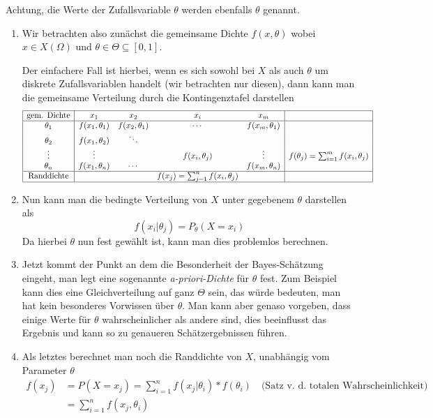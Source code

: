 Achtung, die Werte der Zufallsvariable $\theta$ werden ebenfalls $\theta$ genannt.
\begin{enumerate}
	\item 
	Wir betrachten also zunächst die gemeinsame Dichte $f(x,\theta)$ wobei $x\in X(\Omega)$ und $\theta\in \Theta\subseteq[0,1]$. 

	Der einfachere Fall ist hierbei, wenn es sich sowohl bei $X$ als auch $\theta$ um diskrete Zufallsvariablen handelt (wir betrachten nur diesen), dann kann man die gemeinsame Verteilung durch die Kontingenztafel darstellen
	$$
	\begin{array}{|c|cccc|c|}
		\hline \text{gem. Dichte}&x_1&x_2&x_i&x_m&\\\hline
		\theta_1&f(x_1,\theta_1)&f(x_2,\theta_1)&\cdots&f(x_m,\theta_1)&\\
		\theta_2&f(x_1,\theta_2)&\ddots&&&\\
		\vdots&\vdots&&f(x_i,\theta_j)&\vdots&f(\theta_j)=\sum_{i=1}^m f(x_i,\theta_j)\\
		\theta_n&f(x_1,\theta_n)&\cdots&&f(x_m,\theta_n)&\\\hline
		\text{Randdichte}&&&f(x_j)=\sum_{j=1}^n f(x_i,\theta_j)&&\\\hline
	\end{array}
	$$

	\item Nun kann man die bedingte Verteilung von $X$ unter gegebenem $\theta$ darstellen als
	\begin{equation*}
		f(x_i|\theta_j)=P_\theta(X=x_i)
	\end{equation*}
	Da hierbei $\theta$ nun fest gewählt ist, kann man dies problemlos berechnen.

	\item Jetzt kommt der Punkt an dem die Besonderheit der Bayes-Schätzung eingeht, man legt eine sogenannte \emph{a-priori-Dichte} für $\theta$ fest. 
	Zum Beispiel kann dies eine Gleichverteilung auf ganz $\Theta$ sein, das würde bedeuten, man hat kein besonderes Vorwissen über $\theta$.
	Man kann aber genaso vorgeben, dass einige Werte für $\theta$ wahrscheinlicher als andere sind, dies beeinflusst das Ergebnis und kann so zu genaueren Schätzergebnissen führen.

	\item Als letztes berechnet man noch die Randdichte von $X$, unabhängig vom Parameter $\theta$
	\begin{align*}
		f(x_j)&=P(X=x_j)=\sum_{i=1}^n f(x_j|\theta_i)*f(\theta_i)\quad\text{(Satz v. d. totalen Wahrscheinlichkeit)}\\
		&=\sum_{i=1}^n f(x_j,\theta_i)
	\end{align*}
\end{enumerate}

